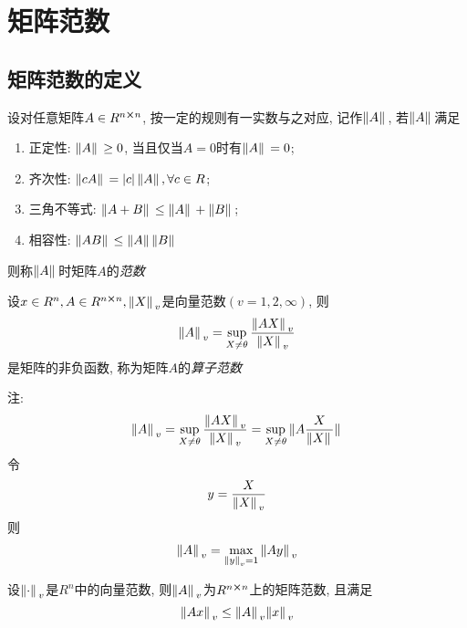 \section{矩阵范数}

\subsection{矩阵范数的定义}

\begin{definition}
    设对任意矩阵$A\in R^{n\cross n}$, 按一定的规则有一实数与之对应, 记作$\norm*{A}$, 若$\norm*{A}$满足
    \begin{enumerate}
        \item 正定性: $\norm*{A}\ge0$, 当且仅当$A=0$时有$\norm*{A}=0$;
        \item 齐次性: $\norm*{cA}=\abs*{c}\norm*{A}, \forall c\in R$;
        \item 三角不等式: $\norm*{A+B}\le\norm*{A}+\norm*{B}$;
        \item 相容性: $\norm*{AB}\le\norm*{A}\norm*{B}$
    \end{enumerate}
    则称$\norm*{A}$时矩阵$A$的\emph{范数}
\end{definition}

\begin{definition}[矩阵的算子范数]
    设$x\in R^n, A\in R^{n\cross n}, \norm*{X}_v$是向量范数$(v=1,2,\infty)$, 则
    \begin{equation*}
        \norm*{A}_v=\sup_{X\ne\theta}\frac{\norm*{AX}_v}{\norm*{X}_v}
    \end{equation*}
    是矩阵的非负函数, 称为矩阵$A$的\emph{算子范数}
\end{definition}

注: 
\begin{equation*}
    \norm*{A}_v=\sup_{X\ne\theta}\frac{\norm*{AX}_v}{\norm*{X}_v}=\sup_{X\ne\theta}\norm*{A\frac{X}{\norm*{X}}}
\end{equation*}
令
\begin{equation*}
    y=\frac{X}{\norm*{X}_v}
\end{equation*}
则
\begin{equation*}
    \norm*{A}_v=\max_{\norm*{y}_v=1}\norm*{Ay}_v
\end{equation*}

\begin{theorem}
    设$\norm*{\cdot}_v$是$R^n$中的向量范数, 则$\norm*{A}_v$为$R^{n\cross n}$上的矩阵范数, 且满足
    \begin{equation*}
        \norm*{Ax}_v\le\norm*{A}_v\norm*{x}_v
    \end{equation*}
\end{theorem}

